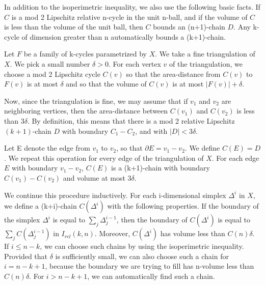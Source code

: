 \documentclass{amsart}
\newtheorem*{Theorem 1}{Theorem 1}
\newtheorem*{Theorem 2}{Theorem 2}
\newtheorem*{Theorem 1A}{Theorem 1A}
\newtheorem*{Theorem 2A}{Theorem 2A}
\newtheorem*{vanishing lemma}{Vanishing Lemma}
\numberwithin{equation}{section}
\begin{document}
In addition to the isoperimetric inequality, we also use the
following basic facts.  If $C$ is a mod 2 Lipschitz relative
n-cycle in the unit n-ball, and if the volume of $C$ is less than
the volume of the unit ball, then $C$ bounds an (n+1)-chain $D$. 
Any k-cycle of dimension greater than n automatically bounds a
(k+1)-chain.

Let $F$ be a family of k-cycles parametrized by $X$.  We take a
fine triangulation of $X$.  We pick a small number $\delta > 0$. 
For each vertex $v$ of the triangulation, we choose a mod 2
Lipschitz cycle $C(v)$ so that the area-distance from $C(v)$ to
$F(v)$ is at most $\delta$ and so that the volume of $C(v)$ is at
most $|F(v)| + \delta$.

Now, since the triangulation is fine, we may assume that if $v_1$
and $v_2$ are neighboring vertices, then the area-distance
between $C(v_1)$ and $C(v_2)$ is less than $3 \delta$.  By
definition, this means that there is a mod 2 relative Lipschitz
$(k+1)$-chain $D$ with boundary $C_1 - C_2$, and with $|D| <
3 \delta$.

Let E denote the edge from $v_1$ to $v_2$, so that $\partial E =
v_1 - v_2$.  We define $C(E) = D$.  We repeat this operation for
every edge of the triangulation of $X$.  For each edge $E$ with
boundary $v_1 - v_2$, $C(E)$ is a (k+1)-chain with boundary
$C(v_1) - C(v_2)$ and volume at most $3 \delta$.

We continue this procedure inductively.  For each i-dimensional
simplex $\Delta^i$ in $X$, we define a (k+i)-chain $C(\Delta^i)$
with the following properties.  If the boundary of the simplex
$\Delta^i$ is equal to $\sum_j \Delta_j^{i-1}$, then the boundary
of $C(\Delta^i)$ is equal to $\sum_j C(\Delta_j^{i-1})$ in 
$I_{rel}(k,n)$.  Moreover, $C(\Delta^i)$ has volume less than
$C(n) \delta$.  If $i \le n-k$, we can choose such chains by
using the isoperimetric inequality.  Provided that $\delta$ is
sufficiently small, we can also choose such a chain for $i = n-k
+ 1$, because the boundary we are trying to fill has n-volume
less than $C(n) \delta$. For $i > n-k+1$, we can automatically
find such a chain.
\end{document}
